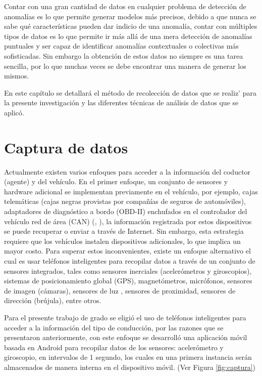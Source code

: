 Contar con una gran cantidad de datos en cualquier problema de detecci\'{o}n de anomal\'{i}as es lo que permite generar modelos m\'{a}s precisos, debido a que nunca se sabe qu\'{e} caracter\'{i}sticas pueden dar indicio de una anomal\'{i}a, contar con m\'{u}ltiples tipos de datos es lo que permite ir m\'{a}s all\'{a} de una mera detecci\'{o}n de anomal\'{i}as puntuales y ser capaz de identificar anomal\'{i}as contextuales o colectivas m\'{a}s sofisticadas. Sin embargo la obtenci\'{o}n de estos datos no siempre es una tarea sencilla, por lo que muchas veces se debe encontrar una manera de generar los mismos.

\vspace{5mm} %

En este cap\'{i}tulo se detallar\'{a} el m\'{e}todo de recolecci\'{o}n de datos que se realiz\'{} para la presente investigaci\'{o}n y las diferentes t\'{e}cnicas de an\'{a}lisis de datos que se aplic\'{o}.

\section{Captura de datos} \label{cap:CapDatos}

Actualmente existen varios enfoques para acceder a la información del coductor (agente) y del vehículo. En el primer enfoque, un conjunto de sensores y hardware adicional se implementan previamente en el veh\'{i}culo, por ejemplo, cajas telemáticas (cajas negras provistas por compañías de seguros de automóviles), adaptadores de diagnóstico a bordo (OBD-II) enchufados en el controlador del vehículo red de área (CAN) (\cite{30}, \cite{31}), la información registrada por estos dispositivos se puede recuperar o enviar a través de Internet. Sin embargo, esta estrategia requiere que los vehículos instalen dispositivos adicionales, lo que implica un mayor costo. Para superar estos inconvenientes, existe un enfoque alternativo el cual es usar teléfonos inteligentes para recopilar datos a través de un conjunto de sensores integrados, tales como sensores inerciales (acelerómetros y giroscopios), sistemas de posicionamiento global (GPS), magnetómetros, micrófonos, sensores de imagen (cámaras), sensores de luz , sensores de proximidad, sensores de dirección (brújula), entre otros.

\vspace{5mm} %

Para el presente trabajo de grado se eligi\'{o} el uso de tel\'{e}fonos inteligentes para acceder a la informaci\'{o}n del tipo de conducci\'{o}n, por las razones que se presentaron anteriormente, con este enfoque se desarroll\'{o} una aplicaci\'{o}n m\'{o}vil basada en Android para recopilar datos de los sensores: aceler\'{o}metro y giroscopio, en intervalos de 1 segundo, los cuales en una primera instancia ser\'{a}n almacenados de manera interna en el dispositivo m\'{o}vil. (Ver Figura \ref{fig:captura})


